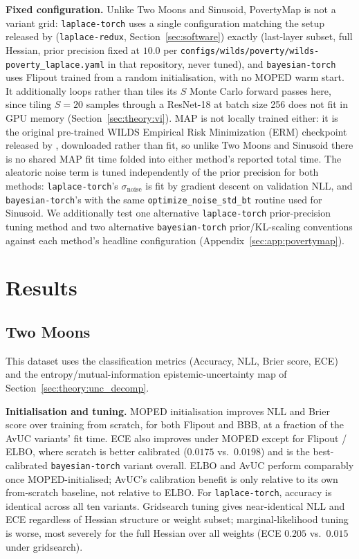 \documentclass[conference]{IEEEtran}
\begin{document}
\textbf{Fixed configuration.} Unlike Two Moons and Sinusoid, PovertyMap is not a variant
grid: \texttt{laplace-torch} uses a single configuration matching the setup released by
\citet{daxberger2021laplace} (\texttt{laplace-redux}, Section~\ref{sec:software}) exactly
(last-layer subset, full Hessian, prior precision fixed at $10.0$ per
\texttt{configs/\allowbreak wilds/\allowbreak poverty/\allowbreak wilds-poverty\_laplace.yaml}
in that repository, never tuned), and
\texttt{bayesian-torch} uses Flipout trained from a random initialisation, with no MOPED
warm start. It additionally loops rather than tiles its $S$ Monte Carlo forward passes here,
since tiling $S=20$ samples through a ResNet-18 at batch size 256 does not fit in GPU memory
(Section~\ref{sec:theory:vi}). MAP is not locally trained either: it is the original
pre-trained WILDS Empirical Risk Minimization (ERM) checkpoint released
by \citet{daxberger2021laplace}, downloaded rather than fit, so unlike
Two Moons and Sinusoid there is no shared MAP fit time folded into either method's reported
total time. The aleatoric noise term is tuned independently of the prior precision for both
methods: \texttt{laplace-torch}'s $\sigma_{\text{noise}}$ is fit by gradient descent on
validation NLL, and \texttt{bayesian-torch}'s with the same \texttt{optimize\_noise\_std\_bt}
routine used for Sinusoid. We additionally test one alternative \texttt{laplace-torch}
prior-precision tuning method and two alternative \texttt{bayesian-torch} prior/KL-scaling
conventions against each method's headline configuration
(Appendix~\ref{sec:app:povertymap}).

\section{Results}
\label{sec:results}

\subsection{Two Moons}

This dataset uses the classification metrics (Accuracy, NLL, Brier score, ECE) and the
entropy/mutual-information epistemic-uncertainty map of
Section~\ref{sec:theory:unc_decomp}.

\textbf{Initialisation and tuning.} MOPED initialisation improves NLL and Brier score
over training from scratch, for both Flipout and BBB, at a fraction of the AvUC variants'
fit time. ECE also improves under MOPED except for Flipout / ELBO, where scratch is better
calibrated ($0.0175$ vs.\ $0.0198$) and is the best-calibrated
\texttt{bayesian-torch} variant overall. ELBO and AvUC perform comparably once
MOPED-initialised; AvUC's calibration benefit is only relative to its own from-scratch
baseline, not relative to ELBO. For \texttt{laplace-torch}, accuracy is identical across all
ten variants. Gridsearch tuning gives near-identical NLL and ECE regardless of Hessian
structure or weight subset; marginal-likelihood tuning is worse, most severely for the full
Hessian over all weights (ECE $0.205$ vs.\ $0.015$ under gridsearch).
\end{document}

